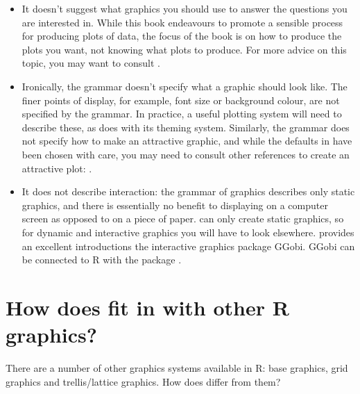 \begin{itemize}
  \item It doesn't suggest what graphics you should use to answer the questions you are interested in.  While this book endeavours to promote a sensible process for producing plots of data, the focus of the book is on how to produce the plots you want, not knowing what plots to produce. For more advice on this topic, you may want to consult  \citet{robbins:2004,cleveland:1993,chambers:1983,tukey:1977}.

  \item Ironically, the grammar doesn't specify what a graphic should look like.  The finer points of display, for example, font size or background colour, are not specified by the grammar.  In practice, a useful plotting system will need to describe these, as \ggplot does with its theming system. Similarly, the grammar does not specify how to make an attractive graphic, and while the defaults in \ggplot have been chosen with care, you may need to consult other references to create an attractive plot: \citet{tufte:1990,tufte:1997,tufte:2001,tufte:2006}.

  \item It does not describe interaction: the grammar of graphics describes only static graphics, and there is essentially no benefit to displaying on a computer screen as opposed to on a piece of paper.  \ggplot can only create static graphics, so for dynamic and interactive graphics you will have to look elsewhere.  \citet{cook:2007} provides an excellent introductions the interactive graphics package GGobi.  GGobi can be connected to R with the  package \citep{wickham:2007i}.

\end{itemize}

\section{How does \ggplot fit in with other R graphics?}

There are a number of other graphics systems available in R: base graphics, grid graphics and trellis/lattice graphics.  How does \ggplot differ from them?

